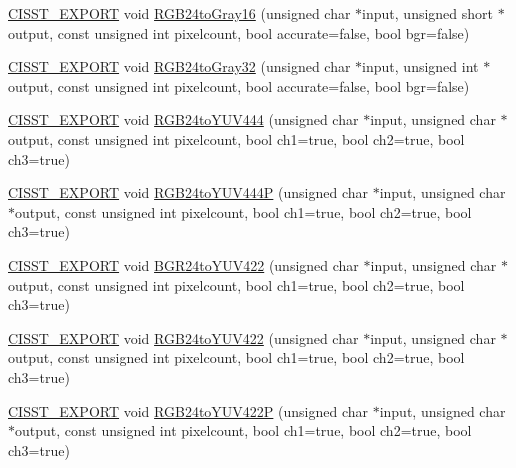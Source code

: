 \begin{DoxyCompactItemize}
\item 
\hyperlink{cmn_export_macros_8h_a99393e0c3ac434b2605235bbe20684f8}{C\-I\-S\-S\-T\-\_\-\-E\-X\-P\-O\-R\-T} void \hyperlink{namespacesvl_converter_abf6e775d4d85227bca12d93a28040bd0}{R\-G\-B24to\-Gray16} (unsigned char $\ast$input, unsigned short $\ast$output, const unsigned int pixelcount, bool accurate=false, bool bgr=false)
\item 
\hyperlink{cmn_export_macros_8h_a99393e0c3ac434b2605235bbe20684f8}{C\-I\-S\-S\-T\-\_\-\-E\-X\-P\-O\-R\-T} void \hyperlink{namespacesvl_converter_a6db9feff4a905fa89f7029fe43c2b469}{R\-G\-B24to\-Gray32} (unsigned char $\ast$input, unsigned int $\ast$output, const unsigned int pixelcount, bool accurate=false, bool bgr=false)
\item 
\hyperlink{cmn_export_macros_8h_a99393e0c3ac434b2605235bbe20684f8}{C\-I\-S\-S\-T\-\_\-\-E\-X\-P\-O\-R\-T} void \hyperlink{namespacesvl_converter_a542ef242e36659b60aca4479902d9cc5}{R\-G\-B24to\-Y\-U\-V444} (unsigned char $\ast$input, unsigned char $\ast$output, const unsigned int pixelcount, bool ch1=true, bool ch2=true, bool ch3=true)
\item 
\hyperlink{cmn_export_macros_8h_a99393e0c3ac434b2605235bbe20684f8}{C\-I\-S\-S\-T\-\_\-\-E\-X\-P\-O\-R\-T} void \hyperlink{namespacesvl_converter_a645ff539cbb8bc5af41fbde1ae339c38}{R\-G\-B24to\-Y\-U\-V444\-P} (unsigned char $\ast$input, unsigned char $\ast$output, const unsigned int pixelcount, bool ch1=true, bool ch2=true, bool ch3=true)
\item 
\hyperlink{cmn_export_macros_8h_a99393e0c3ac434b2605235bbe20684f8}{C\-I\-S\-S\-T\-\_\-\-E\-X\-P\-O\-R\-T} void \hyperlink{namespacesvl_converter_a749dd58d1642cb7c3ffd5f395b07cbe1}{B\-G\-R24to\-Y\-U\-V422} (unsigned char $\ast$input, unsigned char $\ast$output, const unsigned int pixelcount, bool ch1=true, bool ch2=true, bool ch3=true)
\item 
\hyperlink{cmn_export_macros_8h_a99393e0c3ac434b2605235bbe20684f8}{C\-I\-S\-S\-T\-\_\-\-E\-X\-P\-O\-R\-T} void \hyperlink{namespacesvl_converter_a075ff677fa0c08ea9a6985c066f5fd6c}{R\-G\-B24to\-Y\-U\-V422} (unsigned char $\ast$input, unsigned char $\ast$output, const unsigned int pixelcount, bool ch1=true, bool ch2=true, bool ch3=true)
\item 
\hyperlink{cmn_export_macros_8h_a99393e0c3ac434b2605235bbe20684f8}{C\-I\-S\-S\-T\-\_\-\-E\-X\-P\-O\-R\-T} void \hyperlink{namespacesvl_converter_a91b8e9ef5654edf30dbef536b7921457}{R\-G\-B24to\-Y\-U\-V422\-P} (unsigned char $\ast$input, unsigned char $\ast$output, const unsigned int pixelcount, bool ch1=true, bool ch2=true, bool ch3=true)

\end{DoxyCompactItemize}
